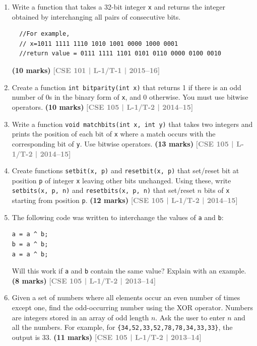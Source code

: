 \documentclass[12pt,a3paper]{article}
\newcommand{\yr}[1]{\hfill\textcolor{gray}{\small\textbf{[#1]}}}
\newcommand{\mk}[1]{\textcolor{orange!70!black}{\small\textbf{(#1 marks)}}}
\begin{document}
\begin{enumerate}
\item Write a function that takes a 32-bit integer \texttt{x} and returns the integer obtained by interchanging all pairs of consecutive bits.
\begin{lstlisting}
  //For example,
  // x=1011 1111 1110 1010 1001 0000 1000 0001
  //return value = 0111 1111 1101 0101 0110 0000 0100 0010
\end{lstlisting}

\mk{10} \yr{CSE 101 | L-1/T-1 | 2015--16}

\item Create a function \texttt{int bitparity(int x)} that returns 1 if there is an odd number of 0s in the binary form of \texttt{x}, and 0 otherwise. You must use bitwise operators.
\mk{10} \yr{CSE 105 | L-1/T-2 | 2014--15}

\item Write a function \texttt{void matchbits(int x, int y)} that takes two integers and prints the position of each bit of \texttt{x} where a match occurs with the corresponding bit of \texttt{y}. Use bitwise operators.
\mk{13} \yr{CSE 105 | L-1/T-2 | 2014--15}

\item Create functions \texttt{setbit(x, p)} and \texttt{resetbit(x, p)} that set/reset bit at position \texttt{p} of integer \texttt{x} leaving other bits unchanged. Using these, write \texttt{setbits(x, p, n)} and \texttt{resetbits(x, p, n)} that set/reset $n$ bits of \texttt{x} starting from position \texttt{p}.
\mk{12} \yr{CSE 105 | L-1/T-2 | 2014--15}

\item The following code was written to interchange the values of \texttt{a} and \texttt{b}:
 
\begin{lstlisting}
a = a ^ b;
b = a ^ b;
a = a ^ b;
\end{lstlisting}
Will this work if \texttt{a} and \texttt{b} contain the same value? Explain with an example.
\mk{8} \yr{CSE 105 | L-1/T-2 | 2013--14}

\item Given a set of numbers where all elements occur an even number of times except one, find the odd-occurring number using the XOR operator. Numbers are integers stored in an array of odd length $n$. Ask the user to enter $n$ and all the numbers. For example, for \texttt{\{34,52,33,52,78,78,34,33,33\}}, the output is 33.
\mk{11} \yr{CSE 105 | L-1/T-2 | 2013--14}


\end{enumerate}
\end{document}
